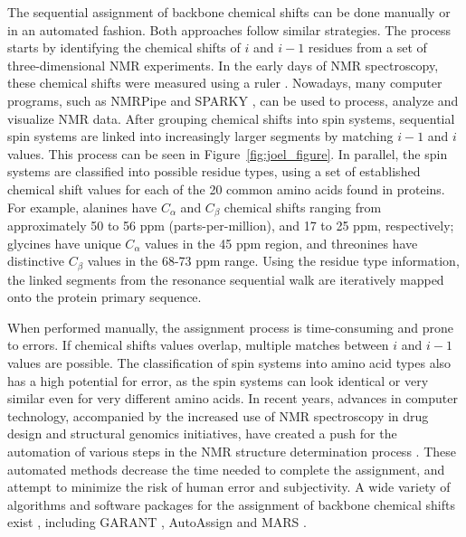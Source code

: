 \documentclass{article}
\begin{document}
The sequential assignment of backbone chemical shifts can be done manually or in an automated fashion. Both approaches follow similar strategies. The process starts by identifying the chemical shifts of $i$ and $i-1$ residues from a set of three-dimensional NMR experiments. In the early days of NMR spectroscopy, these chemical shifts were measured using a ruler \cite{guntert}. Nowadays, many computer programs, such as NMRPipe \cite{nmrpipe} and SPARKY \cite{goddard}, can be used to process, analyze and visualize NMR data. After grouping chemical shifts into spin systems, sequential spin systems are linked into increasingly larger segments by matching $i-1$ and $i$ values. This process can be seen in Figure~\ref{fig:joel_figure}. In parallel, the spin systems are classified into possible residue types, using a set of established chemical shift values for each of the 20 common amino acids found in proteins. For example, alanines have $C_{\alpha}$ and $C_{\beta}$ chemical shifts ranging from approximately 50 to 56 ppm (parts-per-million), and 17 to 25 ppm, respectively; glycines have unique $C_{\alpha}$ values in the 45 ppm region, and threonines have distinctive $C_{\beta}$ values in the 68-73 ppm range\cite{wishart, wang}. Using the residue type information, the linked segments from the resonance sequential walk are iteratively mapped onto the protein primary sequence. 

When performed manually, the assignment process is time-consuming and prone to errors. If chemical shifts values overlap, multiple matches between $i$ and $i-1$ values are possible. The classification of spin systems into amino acid types also has a high potential for error, as the spin systems can look identical or very similar even for very different amino acids. In recent years, advances in computer technology, accompanied by the increased use of NMR spectroscopy in drug design and structural genomics initiatives, have created a push for the automation of various steps in the NMR structure determination process \cite{moseley}. These automated methods decrease the time needed to complete the assignment, and attempt to minimize the risk of human error and subjectivity. A wide variety of algorithms and software packages for the assignment of backbone chemical shifts exist \cite{guntert}, including GARANT \cite{garant}, AutoAssign \cite{moseley,zimmerman} and MARS \cite{mars}.
\end{document}
